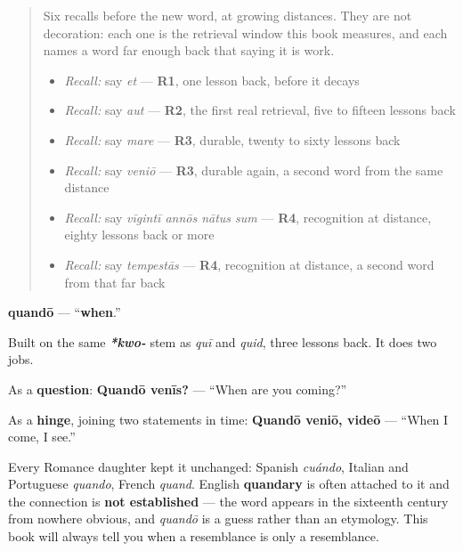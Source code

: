 \label{lesson:LA-C49-quando}



\begin{quote}
Six recalls before the new word, at growing distances. They are not decoration: each one is the retrieval window this book measures, and each names a word far enough back that saying it is work.

\begin{itemize}
\raggedright
  \item \emph{Recall:} say \emph{et} — \textbf{R1}, one lesson back, before it decays
  \item \emph{Recall:} say \emph{aut} — \textbf{R2}, the first real retrieval, five to fifteen lessons back
  \item \emph{Recall:} say \emph{mare} — \textbf{R3}, durable, twenty to sixty lessons back
  \item \emph{Recall:} say \emph{veniō} — \textbf{R3}, durable again, a second word from the same distance
  \item \emph{Recall:} say \emph{vīgintī annōs nātus sum} — \textbf{R4}, recognition at distance, eighty lessons back or more
  \item \emph{Recall:} say \emph{tempestās} — \textbf{R4}, recognition at distance, a second word from that far back
\end{itemize}
\end{quote}

\begin{cousinweb}
\textbf{quandō} — \textquotedblleft{}\textbf{when}.\textquotedblright{}

Built on the same \emph{\textbf{*kwo-}} stem as \emph{quī} and \emph{quid}, three lessons back. It does two jobs.

As a \textbf{question}: \textbf{Quandō venīs?} — \textquotedblleft{}When are you coming?\textquotedblright{}

As a \textbf{hinge}, joining two statements in time: \textbf{Quandō veniō, videō} — \textquotedblleft{}When I come, I see.\textquotedblright{}

Every Romance daughter kept it unchanged: Spanish \emph{cuándo}, Italian and Portuguese \emph{quando}, French \emph{quand}. English \textbf{quandary} is often attached to it and the connection is \textbf{not established} — the word appears in the sixteenth century from nowhere obvious, and \emph{quandō} is a guess rather than an etymology. This book will always tell you when a resemblance is only a resemblance.
\end{cousinweb}

